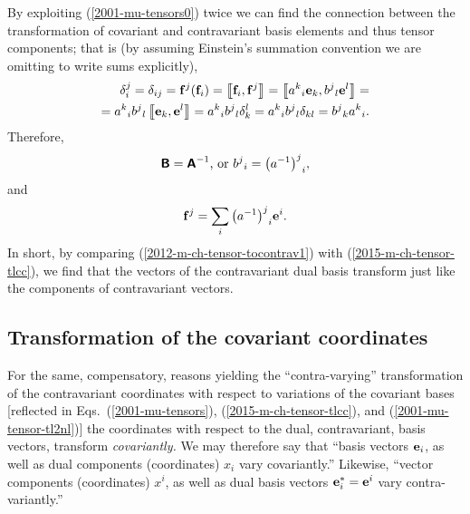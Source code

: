 By exploiting (\ref{2001-mu-tensors0}) twice we can find the connection between
the transformation of covariant and contravariant basis elements and thus
tensor components; that is (by assuming Einstein's summation convention we are omitting to write sums explicitly),
\begin{equation}
\begin{split}
\delta_i^j= \delta_{ij}=
{\bf f}^j({\bf f}_i) =
\left\llbracket {\bf f}_i , {\bf f}^j \right\rrbracket =
\left\llbracket  {a^k}_i {\bf e}_k ,  {b^j}_l {\bf e}^l \right\rrbracket  =
\\
=
{a^k}_i {b^j}_l  \left\llbracket  {\bf e}_k , {\bf e}^l \right\rrbracket
={a^k}_i {b^j}_l   \delta_k^l
={a^k}_i {b^j}_l   \delta_{kl}
={b^j}_k {a^k}_i  .
\end{split}
\end{equation}
Therefore,
\begin{equation}
\textsf{\textbf{B}}
= \textsf{\textbf{A}}^{-1}
\textrm{, or }
{b^j}_i =  {\left( a^{-1} \right)^j}_i,
\label{2012-m-ch-tensor-tocontrav}
\end{equation}
and
\begin{equation}
{\bf f}^j=
\sum_i{\left( a^{-1}\right)^j}_i{\bf e}^i
.
\label{2012-m-ch-tensor-tocontrav1}
\end{equation}
In short, by comparing (\ref{2012-m-ch-tensor-tocontrav1})  with (\ref{2015-m-ch-tensor-tlcc}), we find that the vectors of the contravariant dual basis transform just like the components of contravariant vectors.

\subsection{Transformation of the covariant coordinates}

For the same, compensatory, reasons yielding the ``contra-varying'' transformation of the contravariant coordinates
with respect to variations of the covariant bases [reflected in Eqs.~(\ref{2001-mu-tensors}), (\ref{2015-m-ch-tensor-tlcc}), and (\ref{2001-mu-tensor-tl2nl})]
the coordinates with respect to the dual, contravariant, basis vectors, transform {\em covariantly.}
We may therefore say that
``basis vectors ${\bf e}_i$, as well as dual components (coordinates) $x_i$ vary covariantly.''
Likewise,
``vector components (coordinates) $x^i$, as well as dual basis vectors ${\bf e}^\ast_i= {\bf e}^i$ vary contra-variantly.''


